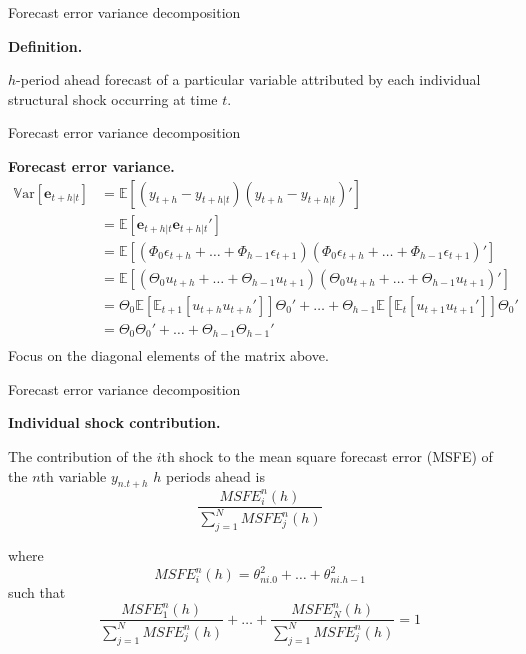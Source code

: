 \documentclass[notes,blackandwhite,mathsans,usenames,dvipsnames]{beamer}
\begin{document}
\begin{frame}{Forecast error variance decomposition}

\textbf{Definition.}

 $h${\color{mcxs2}-period ahead forecast of a particular variable attributed by each individual structural shock occurring at time} $t$.

\end{frame}




\begin{frame}{Forecast error variance decomposition}

\textbf{Forecast error variance.}\small
\begin{align*}
\mathbb{V}\text{ar}[\mathbf{e}_{t+h|t}] &= \mathbb{E}[(y_{t+h}-y_{t+h|t})(y_{t+h}-y_{t+h|t})'] \\
&= \mathbb{E}[\mathbf{e}_{t+h|t}\mathbf{e}_{t+h|t}'] \\
&= \mathbb{E}[(\Phi_0\epsilon_{t+h} +\dots + \Phi_{h-1}\epsilon_{t+1})(\Phi_0\epsilon_{t+h} +\dots + \Phi_{h-1}\epsilon_{t+1})'] \\
&= \mathbb{E}[(\Theta_0u_{t+h} +\dots + \Theta_{h-1}u_{t+1})(\Theta_0u_{t+h} +\dots + \Theta_{h-1}u_{t+1})'] \\
&= \Theta_0\mathbb{E}\left[\mathbb{E}_{t+1}[u_{t+h}u_{t+h}']\right]\Theta_0' + \dots + \Theta_{h-1}\mathbb{E}\left[\mathbb{E}_t[u_{t+1}u_{t+1}']\right]\Theta_0' \\
&= \Theta_0\Theta_0' + \dots + \Theta_{h-1}\Theta_{h-1}'\\
\end{align*} 
{\color{mcxs2}Focus on the diagonal elements of the matrix above.}
\end{frame}






\begin{frame}{Forecast error variance decomposition}

\textbf{Individual shock contribution.}

{\color{mcxs2}The contribution of the} $i${\color{mcxs2}th shock to the mean square forecast error (MSFE) of the} $n${\color{mcxs2}th variable} $y_{n.t+h}$ $h$ {\color{mcxs2}periods ahead is}
$$ \frac{MSFE_i^n(h)}{\sum_{j=1}^{N}MSFE_j^n(h)} $$

\bigskip where
$$ MSFE_i^n(h) = \theta_{ni.0}^2 + \dots + \theta_{ni.h-1}^2 $$
{\color{mcxs2}such that}
$$ \frac{MSFE_1^n(h)}{\sum_{j=1}^{N}MSFE_j^n(h)} + \dots + \frac{MSFE_N^n(h)}{\sum_{j=1}^{N}MSFE_j^n(h)} = 1$$

\end{frame}
\end{document}
